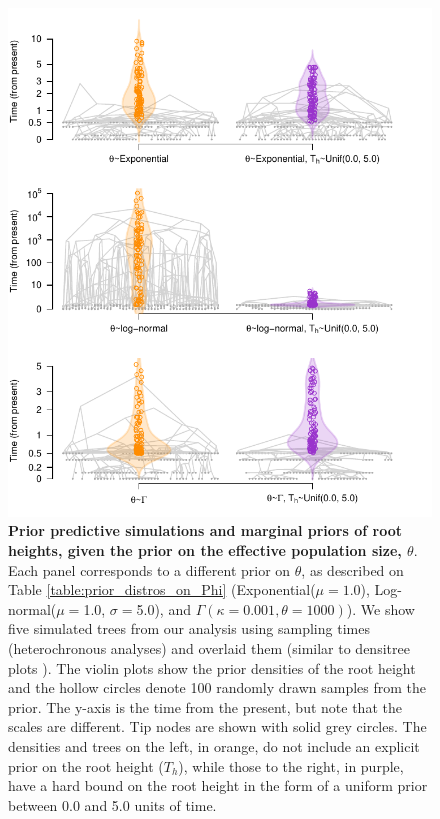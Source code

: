 \documentclass[10pt,letterpaper]{article}
\begin{document}
\begin{figure}[!h]
	\begin{center}
		\includegraphics[width=13cm]{sandbox_figures/prior_tree_distros.pdf}\newline
		\vspace{-0.5cm}
		\caption{\textbf{Prior predictive simulations and marginal priors of root heights, given the prior on the effective population size, $\theta$}. Each panel corresponds to a different prior on $\theta$, as described on Table \ref{table:prior_distros_on_Phi} (Exponential($\mu=1.0$), Log-normal($\mu=$1.0, $\sigma=$5.0), and $\Gamma(\kappa=0.001, \theta=1000)$). We show five simulated trees from our analysis using sampling times (heterochronous analyses) and overlaid them (similar to densitree plots \cite{bouckaert2010densitree}). The violin plots show the prior densities of the root height and the hollow circles denote 100 randomly drawn samples from the prior. The y-axis is the time from the present, but note that the scales are different. Tip nodes are shown with solid grey circles. The densities and trees on the left, in orange, do not include an explicit prior on the root height ($T_h$), while those to the right, in purple, have a hard bound on the root height in the form of a uniform prior between 0.0 and 5.0 units of time.}
		\label{figure:prior_tree_distros}
	\end{center}
\end{figure}
\end{document}
